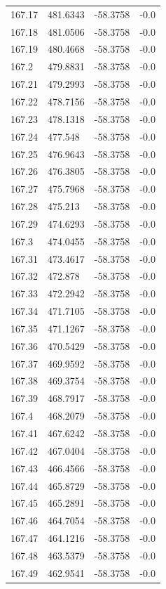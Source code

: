 \begin{table}[H]
\begin{tabular}{llll}
167.17 & 481.6343 & -58.3758 & -0.0 \\
167.18 & 481.0506 & -58.3758 & -0.0 \\
167.19 & 480.4668 & -58.3758 & -0.0 \\
167.2 & 479.8831 & -58.3758 & -0.0 \\
167.21 & 479.2993 & -58.3758 & -0.0 \\
167.22 & 478.7156 & -58.3758 & -0.0 \\
167.23 & 478.1318 & -58.3758 & -0.0 \\
167.24 & 477.548 & -58.3758 & -0.0 \\
167.25 & 476.9643 & -58.3758 & -0.0 \\
167.26 & 476.3805 & -58.3758 & -0.0 \\
167.27 & 475.7968 & -58.3758 & -0.0 \\
167.28 & 475.213 & -58.3758 & -0.0 \\
167.29 & 474.6293 & -58.3758 & -0.0 \\
167.3 & 474.0455 & -58.3758 & -0.0 \\
167.31 & 473.4617 & -58.3758 & -0.0 \\
167.32 & 472.878 & -58.3758 & -0.0 \\
167.33 & 472.2942 & -58.3758 & -0.0 \\
167.34 & 471.7105 & -58.3758 & -0.0 \\
167.35 & 471.1267 & -58.3758 & -0.0 \\
167.36 & 470.5429 & -58.3758 & -0.0 \\
167.37 & 469.9592 & -58.3758 & -0.0 \\
167.38 & 469.3754 & -58.3758 & -0.0 \\
167.39 & 468.7917 & -58.3758 & -0.0 \\
167.4 & 468.2079 & -58.3758 & -0.0 \\
167.41 & 467.6242 & -58.3758 & -0.0 \\
167.42 & 467.0404 & -58.3758 & -0.0 \\
167.43 & 466.4566 & -58.3758 & -0.0 \\
167.44 & 465.8729 & -58.3758 & -0.0 \\
167.45 & 465.2891 & -58.3758 & -0.0 \\
167.46 & 464.7054 & -58.3758 & -0.0 \\
167.47 & 464.1216 & -58.3758 & -0.0 \\
167.48 & 463.5379 & -58.3758 & -0.0 \\
167.49 & 462.9541 & -58.3758 & -0.0 \\

\end{tabular}
\end{table}
